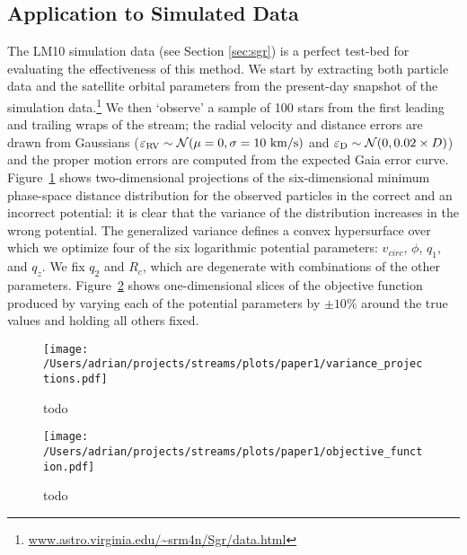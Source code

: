 \documentclass[preprint]{aastex}
\begin{document}
\subsection{Application to Simulated Data} \label{sec:results}
The LM10 simulation data (see Section \ref{sec:sgr}) is a perfect
test-bed for evaluating the effectiveness of this method. We start by
extracting both particle data and the satellite orbital parameters
from the present-day snapshot of the simulation
data.\footnote{\url{www.astro.virginia.edu/~srm4n/Sgr/data.html}} We
then `observe' a sample of 100 stars from the first leading and
trailing wraps of the stream; the radial velocity and distance errors are drawn %
from Gaussians ($\varepsilon_{\rm RV} \sim \mathcal{N}(\mu=0,\sigma=10~{\rm
  km/s})$ and $\varepsilon_{\rm D} \sim \mathcal{N}(0,0.02\times
D)$) and the proper motion errors are computed from the expected Gaia error curve. Figure~\ref{fig:variance_proj} shows two-dimensional projections
of the six-dimensional minimum phase-space distance distribution for
the observed particles in the correct and an incorrect potential: it
is clear that the variance of the distribution increases in the wrong
potential. The generalized variance defines a convex hypersurface over
which we optimize four of the six logarithmic potential parameters:
$v_{circ}$, $\phi$, $q_1$, and $q_z$. We fix $q_2$ and $R_c$, which
are degenerate with combinations of the other
parameters. Figure~\ref{fig:objective} shows one-dimensional slices of
the objective function produced by varying each of the potential
parameters by $\pm10\%$ around the true values and holding all others
fixed.

\begin{figure}[h]
\begin{center}
\texttt{[image: /Users/adrian/projects/streams/plots/paper1/variance\_projections.pdf]}
\caption{ todo }\label{fig:variance_proj}
\end{center}
\end{figure}

\begin{figure}[h]
\begin{center}
\texttt{[image: /Users/adrian/projects/streams/plots/paper1/objective\_function.pdf]}
\caption{ todo }\label{fig:objective}
\end{center}
\end{figure}
\end{document}
